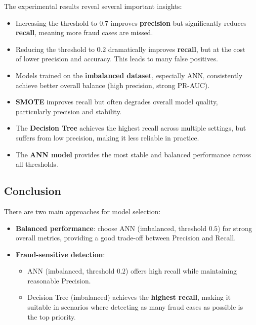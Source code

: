 The experimental results reveal several important insights:

\begin{itemize}
    \item Increasing the threshold to $0.7$ improves \textbf{precision} but significantly reduces \textbf{recall}, meaning more fraud cases are missed.
    
    \item Reducing the threshold to $0.2$ dramatically improves \textbf{recall}, but at the cost of lower precision and accuracy. This leads to many false positives.
    
    \item Models trained on the \textbf{imbalanced dataset}, especially ANN, consistently achieve better overall balance (high precision, strong PR-AUC).
    
    \item \textbf{SMOTE} improves recall but often degrades overall model quality, particularly precision and stability.
    
    \item The \textbf{Decision Tree} achieves the highest recall across multiple settings, but suffers from low precision, making it less reliable in practice.
    
    \item The \textbf{ANN model} provides the most stable and balanced performance across all thresholds.
\end{itemize}



\subsection{Conclusion}

There are two main approaches for model selection:

\begin{itemize}
    \item \textbf{Balanced performance}: choose ANN (imbalanced, threshold $0.5$) for strong overall metrics, providing a good trade-off between Precision and Recall.
    
    \item \textbf{Fraud-sensitive detection}: 
    \begin{itemize}
        \item ANN (imbalanced, threshold $0.2$) offers high recall while maintaining reasonable Precision.
        \item Decision Tree (imbalanced) achieves the \textbf{highest recall}, making it suitable in scenarios where detecting as many fraud cases as possible is the top priority.
    \end{itemize}
\end{itemize}

